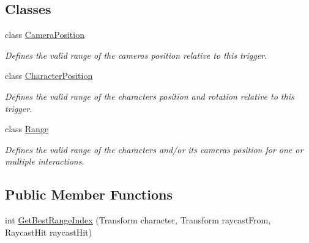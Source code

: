\subsection*{Classes}
\begin{DoxyCompactItemize}
\item 
class \mbox{\hyperlink{class_root_motion_1_1_final_i_k_1_1_interaction_trigger_1_1_camera_position}{Camera\+Position}}
\begin{DoxyCompactList}\small\item\em Defines the valid range of the camera\textquotesingle{}s position relative to this trigger. \end{DoxyCompactList}\item 
class \mbox{\hyperlink{class_root_motion_1_1_final_i_k_1_1_interaction_trigger_1_1_character_position}{Character\+Position}}
\begin{DoxyCompactList}\small\item\em Defines the valid range of the character\textquotesingle{}s position and rotation relative to this trigger. \end{DoxyCompactList}\item 
class \mbox{\hyperlink{class_root_motion_1_1_final_i_k_1_1_interaction_trigger_1_1_range}{Range}}
\begin{DoxyCompactList}\small\item\em Defines the valid range of the character\textquotesingle{}s and/or it\textquotesingle{}s camera\textquotesingle{}s position for one or multiple interactions. \end{DoxyCompactList}\end{DoxyCompactItemize}
\subsection*{Public Member Functions}
\begin{DoxyCompactItemize}
\item 
int \mbox{\hyperlink{class_root_motion_1_1_final_i_k_1_1_interaction_trigger_a4ba6f97d425f444651063667def017e0}{Get\+Best\+Range\+Index}} (Transform character, Transform raycast\+From, Raycast\+Hit raycast\+Hit)
\end{DoxyCompactItemize}
